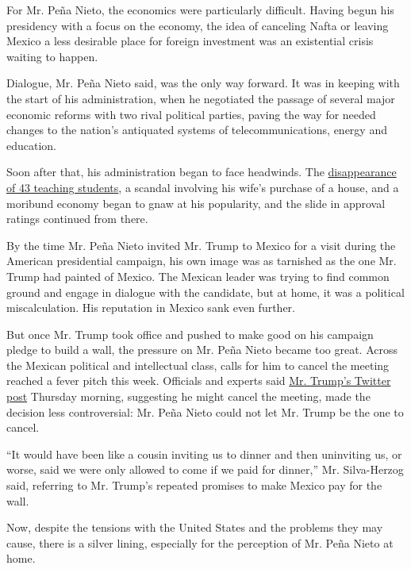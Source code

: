 For Mr. Peña Nieto, the economics were particularly difficult. Having
begun his presidency with a focus on the economy, the idea of canceling
Nafta or leaving Mexico a less desirable place for foreign investment
was an existential crisis waiting to happen.

Dialogue, Mr. Peña Nieto said, was the only way forward. It was in
keeping with the start of his administration, when he negotiated the
passage of several major economic reforms with two rival political
parties, paving the way for needed changes to the nation's antiquated
systems of telecommunications, energy and education.

Soon after that, his administration began to face headwinds. The
\href{https://www.nytimes.com/2016/04/25/world/americas/missing-mexican-students-suffered-a-night-of-terror-investigators-say.html}{disappearance
of 43 teaching students}, a scandal involving his wife's purchase of a
house, and a moribund economy began to gnaw at his popularity, and the
slide in approval ratings continued from there.

By the time Mr. Peña Nieto invited Mr. Trump to Mexico for a visit
during the American presidential campaign, his own image was as
tarnished as the one Mr. Trump had painted of Mexico. The Mexican leader
was trying to find common ground and engage in dialogue with the
candidate, but at home, it was a political miscalculation. His
reputation in Mexico sank even further.

But once Mr. Trump took office and pushed to make good on his campaign
pledge to build a wall, the pressure on Mr. Peña Nieto became too great.
Across the Mexican political and intellectual class, calls for him to
cancel the meeting reached a fever pitch this week. Officials and
experts said
\href{https://twitter.com/realDonaldTrump/status/824616644370714627}{Mr.
Trump's Twitter post} Thursday morning, suggesting he might cancel the
meeting, made the decision less controversial: Mr. Peña Nieto could not
let Mr. Trump be the one to cancel.

``It would have been like a cousin inviting us to dinner and then
uninviting us, or worse, said we were only allowed to come if we paid
for dinner,'' Mr. Silva-Herzog said, referring to Mr. Trump's repeated
promises to make Mexico pay for the wall.

Now, despite the tensions with the United States and the problems they
may cause, there is a silver lining, especially for the perception of
Mr. Peña Nieto at home.

